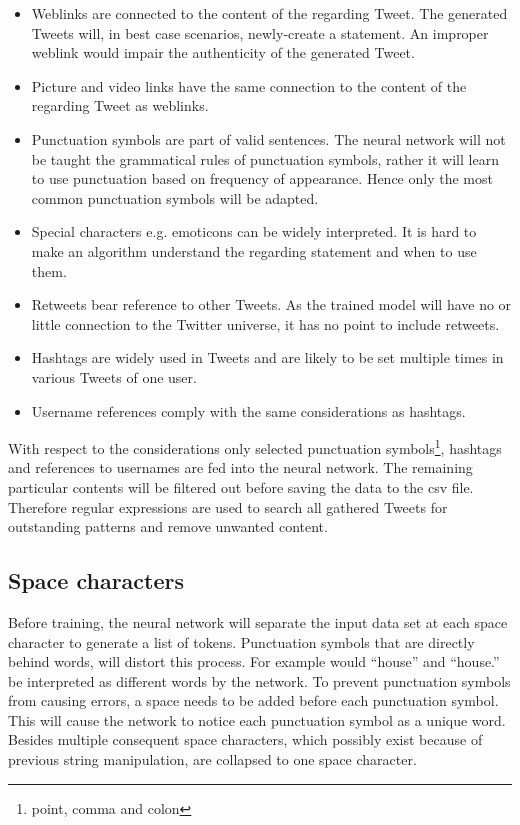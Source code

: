 \documentclass[conference]{IEEEtran}
\begin{document}
\begin{itemize}
\item Weblinks are connected to the content of the regarding Tweet. The generated Tweets will, in best case scenarios, newly-create a statement. An improper weblink would impair the authenticity of the generated Tweet.
\item Picture and video links have the same connection to the content of the regarding Tweet as weblinks.
\item Punctuation symbols are part of valid sentences. The neural network will not be taught the grammatical rules of punctuation symbols, rather it will learn to use punctuation based on frequency of appearance. Hence only the most common punctuation symbols will be adapted.
\item Special characters e.g. emoticons can be widely interpreted. It is hard to make an algorithm understand the regarding statement and when to use them. 
\item Retweets bear reference to other Tweets. As the trained model will have no or little connection to the Twitter universe, it has no point to include retweets.
\item Hashtags are widely used in Tweets and are likely to be set multiple times in various Tweets of one user.
\item Username references comply with the same considerations as hashtags.
\end{itemize}

With respect to the considerations only selected punctuation symbols\footnote{point, comma and colon},  hashtags and references to usernames are fed into the neural network. The remaining particular contents will be filtered out before saving the data to the csv file. Therefore regular expressions are used to search all gathered Tweets for outstanding patterns and remove unwanted content.

\subsection{Space characters}

Before training, the neural network will separate the input data set at each space character to generate a list of tokens. Punctuation symbols that are directly behind words, will distort this process. For example would ``house'' and ``house.'' be interpreted as different words by the network. To prevent punctuation symbols from causing errors, a space needs to be added before each punctuation symbol. This will cause the network to notice each punctuation symbol as a unique word.\\
Besides multiple consequent space characters, which possibly exist because of previous string manipulation, are collapsed to one space character.
\end{document}
